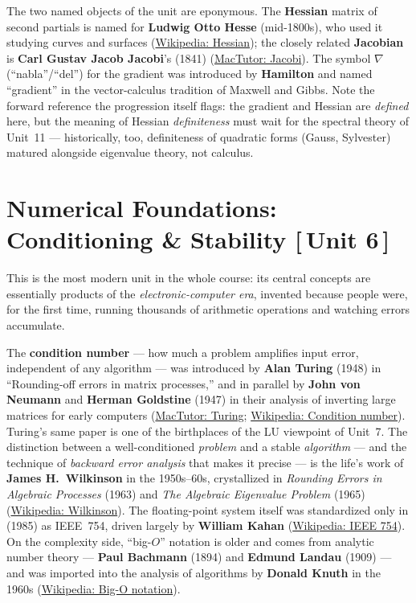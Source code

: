 \documentclass[11pt]{article}
\newcommand{\who}[1]{{\sffamily\bfseries #1}}
\newcommand{\yr}[1]{{\sffamily\color{BrickRed}(#1)}}
\newcommand{\unit}[1]{{\footnotesize\sffamily\color{RoyalBlue}[\,#1\,]}}
\begin{document}
The two named objects of the unit are eponymous. The \who{Hessian} matrix of
second partials is named for \who{Ludwig Otto Hesse} \yr{mid-1800s}, who used it
studying curves and surfaces
(\href{https://en.wikipedia.org/wiki/Hessian_matrix}{Wikipedia: Hessian}); the
closely related \who{Jacobian} is \who{Carl Gustav Jacob Jacobi}'s \yr{1841}
(\href{https://mathshistory.st-andrews.ac.uk/Biographies/Jacobi/}{MacTutor:
Jacobi}). The symbol $\nabla$ (``nabla''/``del'') for the gradient was introduced
by \who{Hamilton} and named ``gradient'' in the vector-calculus tradition of
Maxwell and Gibbs. Note the forward reference the progression itself flags: the
gradient and Hessian are \emph{defined} here, but the meaning of Hessian
\emph{definiteness} must wait for the spectral theory of Unit~11 --- historically,
too, definiteness of quadratic forms (Gauss, Sylvester) matured alongside
eigenvalue theory, not calculus.

\section{Numerical Foundations: Conditioning \& Stability \unit{Unit 6}}

This is the most modern unit in the whole course: its central concepts are
essentially products of the \emph{electronic-computer era}, invented because
people were, for the first time, running thousands of arithmetic operations and
watching errors accumulate.

The \who{condition number} --- how much a problem amplifies input error,
independent of any algorithm --- was introduced by \who{Alan Turing} \yr{1948} in
``Rounding-off errors in matrix processes,'' and in parallel by \who{John von
Neumann} and \who{Herman Goldstine} \yr{1947} in their analysis of inverting large
matrices for early computers
(\href{https://mathshistory.st-andrews.ac.uk/Biographies/Turing/}{MacTutor:
Turing}; \href{https://en.wikipedia.org/wiki/Condition_number}{Wikipedia: Condition
number}). Turing's same paper is one of the birthplaces of the LU viewpoint of
Unit~7. The distinction between a well-conditioned \emph{problem} and a stable
\emph{algorithm} --- and the technique of \emph{backward error analysis} that makes
it precise --- is the life's work of \who{James H.\ Wilkinson} in the 1950s--60s,
crystallized in \emph{Rounding Errors in Algebraic Processes} \yr{1963} and
\emph{The Algebraic Eigenvalue Problem} \yr{1965}
(\href{https://en.wikipedia.org/wiki/James_H._Wilkinson}{Wikipedia: Wilkinson}).
The floating-point system itself was standardized only in \yr{1985} as IEEE~754,
driven largely by \who{William Kahan}
(\href{https://en.wikipedia.org/wiki/IEEE_754\#History}{Wikipedia: IEEE 754}). On
the complexity side, ``big-$O$'' notation is older and comes from analytic number
theory --- \who{Paul Bachmann} \yr{1894} and \who{Edmund Landau} \yr{1909} --- and
was imported into the analysis of algorithms by \who{Donald Knuth} in the 1960s
(\href{https://en.wikipedia.org/wiki/Big_O_notation\#History}{Wikipedia: Big-O
notation}).
\end{document}
